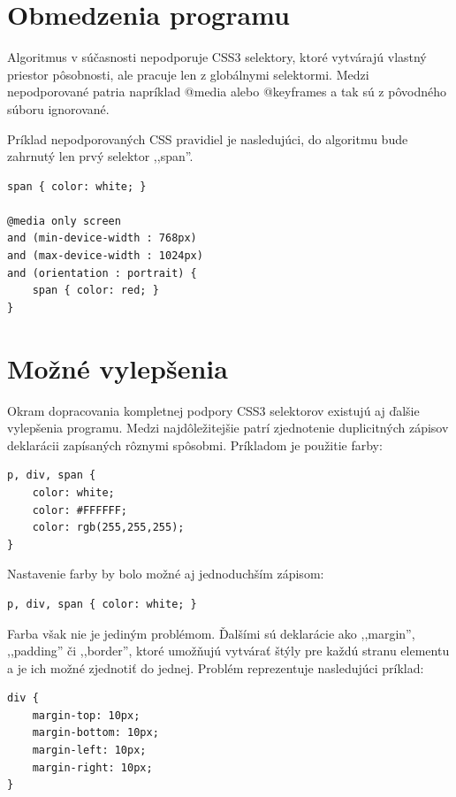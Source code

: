 
\section{Obmedzenia programu} %
\label{sec:obmedzenia_programu}

Algoritmus v súčasnosti nepodporuje CSS3 selektory, ktoré vytvárajú vlastný priestor pôsobnosti, ale pracuje len z globálnymi selektormi. Medzi nepodporované patria napríklad @media alebo @keyframes a tak sú z pôvodného súboru ignorované.

Príklad nepodporovaných CSS pravidiel je nasledujúci, do algoritmu bude zahrnutý len prvý selektor ,,span''.

\begin{verbatim}
span { color: white; }

@media only screen 
and (min-device-width : 768px) 
and (max-device-width : 1024px) 
and (orientation : portrait) {
    span { color: red; }
}
\end{verbatim}


\newpage
\section{Možné vylepšenia} %
\label{sec:mo_n_vylep_enia}

Okram dopracovania kompletnej podpory CSS3 selektorov existujú aj ďalšie vylepšenia programu. Medzi najdôležitejšie patrí zjednotenie duplicitných zápisov deklarácii zapísaných rôznymi spôsobmi. Príkladom je použitie farby:

\begin{verbatim}
p, div, span {	
    color: white; 
    color: #FFFFFF;
    color: rgb(255,255,255);
}
\end{verbatim}

Nastavenie farby by bolo možné aj jednoduchším zápisom:

\begin{verbatim}
p, div, span { color: white; }
\end{verbatim}

Farba však nie je jediným problémom. Ďalšími sú deklarácie ako ,,margin'', ,,padding'' či ,,border'', ktoré umožňujú vytvárať štýly pre každú stranu elementu a je ich možné zjednotiť do jednej. Problém reprezentuje nasledujúci príklad:

\begin{verbatim}
div {	
    margin-top: 10px;
    margin-bottom: 10px;
    margin-left: 10px;
    margin-right: 10px;
}
\end{verbatim}

